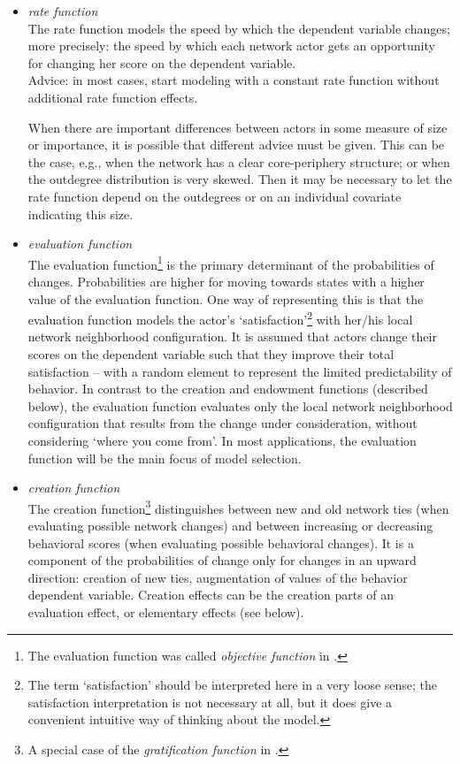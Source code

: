 \documentclass[a4paper,fleqn,11pt]{article}
\newcommand{\+}{\, + \,}
\begin{document}
\begin{itemize}
\item \emph{rate function}\\
The rate function models the speed by which the dependent variable
changes; more precisely: the speed by which each network actor
gets an opportunity for changing her score on the dependent
variable.\\
Advice: in most cases, start modeling with a constant rate function without
additional rate function effects.

When there are important differences between
actors in some measure of size or importance,
it is possible that different advice must be given.
This can be the case, e.g., when the network has a clear
core-periphery structure; or when the outdegree distribution
is very skewed.
Then it may be necessary to let the rate function
depend on the outdegrees or on an individual covariate indicating this size.

\item {\em evaluation function }\\
The evaluation function\footnote{The evaluation function was called
\emph{objective function} in \citet{Snijders01}.}
is the primary determinant of the probabilities of changes.
Probabilities are higher for moving towards states with a higher value
of the evaluation function.
One way of representing this is that the evaluation function
models the actor's `satisfaction'\footnote{The term
`satisfaction' should be interpreted here in a very loose sense;
the satisfaction interpretation is not necessary at all, but it does give
a convenient intuitive way of thinking about the model.}
with her/his local
network neighborhood configuration. It is assumed that actors
change their scores on the dependent variable such that they
improve their total satisfaction -- with a random element
to represent the limited predictability of behavior.
In contrast to the creation and endowment
functions (described below), the evaluation function evaluates only
the local network neighborhood configuration that results from the
change under consideration, without considering `where you come from'.
In most applications, the evaluation function will
be the main focus of model selection.

\newpage
\item {\em creation function }\\
The creation function\footnote{A special case of the {\it gratification
function} in \citet{Snijders01}.}
distinguishes between new and old network
ties (when evaluating possible network changes) and between
increasing or decreasing behavioral scores (when evaluating
possible behavioral changes).
It is a component of the probabilities of change only for changes in
an upward direction: creation of new ties, augmentation of values
of the behavior dependent variable.
Creation effects can be the creation parts of an evaluation effect,
or elementary effects (see below).


\end{itemize}
\end{document}
